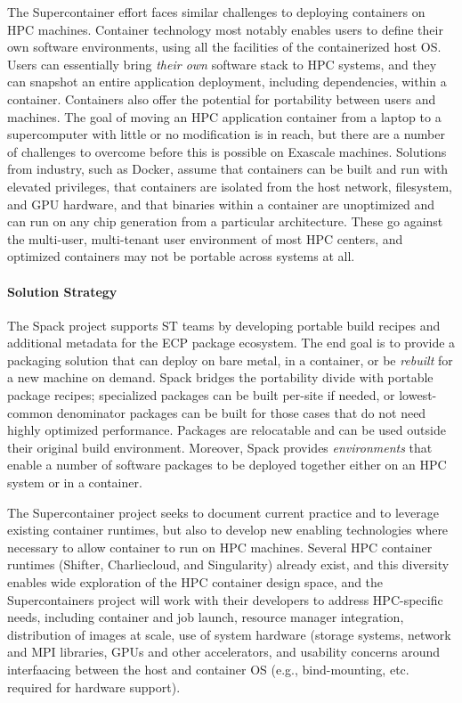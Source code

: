 The Supercontainer effort faces similar challenges to deploying
containers on HPC machines. Container technology most notably enables
users to define their own software environments, using all the facilities
of the containerized host OS.  Users can essentially bring {\it their
own} software stack to HPC systems, and they can snapshot an entire
application deployment, including dependencies, within a container.
Containers also offer the potential for portability between users and
machines. The goal of moving an HPC application container from a laptop
to a supercomputer with little or no modification is in reach, but there
are a number of challenges to overcome before this is possible on
Exascale machines.  Solutions from industry, such as Docker, assume that
containers can be built and run with elevated privileges, that containers
are isolated from the host network, filesystem, and GPU hardware, and
that binaries within a container are unoptimized and can run on any chip
generation from a particular architecture. These go against the
multi-user, multi-tenant user environment of most HPC centers, and
optimized containers may not be portable across systems at all.

\paragraph{Solution Strategy}

The Spack project supports ST teams by developing portable build recipes
and additional metadata for the ECP package ecosystem.  The end goal is
to provide a packaging solution that can deploy on bare metal, in a
container, or be {\it rebuilt} for a new machine on demand. Spack bridges
the portability divide with portable package recipes; specialized
packages can be built per-site if needed, or lowest-common denominator
packages can be built for those cases that do not need highly optimized
performance.  Packages are relocatable and can be used outside their
original build environment.  Moreover, Spack provides {\it environments}
that enable a number of software packages to be deployed together either
on an HPC system or in a container.

The Supercontainer project seeks to document current practice and to
leverage existing container runtimes, but also to develop new enabling
technologies where necessary to allow container to run on HPC machines.
Several HPC container runtimes (Shifter, Charliecloud, and Singularity)
already exist, and this diversity enables wide exploration of the HPC
container design space, and the Supercontainers project will work with
their developers to address HPC-specific needs, including container and
job launch, resource manager integration, distribution of images at
scale, use of system hardware (storage systems, network and MPI
libraries, GPUs and other accelerators, and usability concerns around
interfaacing between the host and container OS (e.g., bind-mounting,
etc. required for hardware support).

